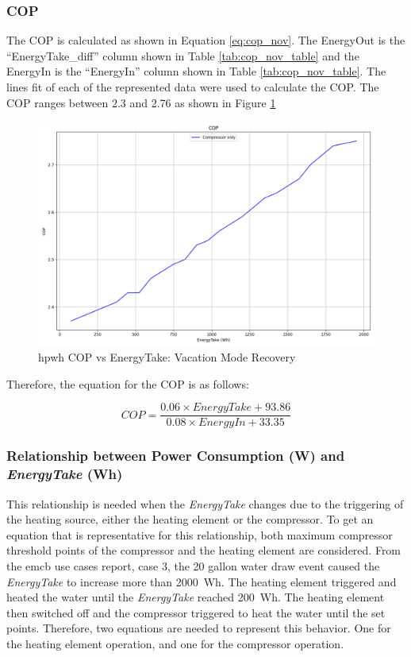 \subsubsection{COP}

The COP is calculated as shown in Equation \ref{eq:cop_nov}. The EnergyOut is the ``EnergyTake\_diff'' column shown in Table \ref{tab:cop_nov_table} and the EnergyIn is the ``EnergyIn'' column shown in Table \ref{tab:cop_nov_table}. The lines fit of each of the represented data were used to calculate the COP. The COP ranges between 2.3 and 2.76 as shown in Figure \ref{fig:cop_nov}

\begin{figure}[htp!]
    \centering
    \includegraphics[width=0.9\columnwidth]{Pictures/cop_nov.png}
    \caption{\gls{hpwh} COP vs EnergyTake: Vacation Mode Recovery}
    \label{fig:cop_nov}
\end{figure}

Therefore, the equation for the COP is as follows:

\begin{equation}\label{eq:cop_nov_lines_fit}
    COP = \frac{0.06 \times \textit{EnergyTake} + 93.86}{0.08 \times \textit{EnergyIn} + 33.35}
\end{equation}

\newpage

\subsubsection{Relationship between Power Consumption (W) and \textit{EnergyTake} (Wh)}

This relationship is needed when the \textit{EnergyTake} changes due to the triggering of the heating source, either the heating element or the compressor. To get an equation that is representative for this relationship, both maximum compressor threshold points of the compressor and the heating element are considered. From the \gls{emcb} use cases report, case 3, the 20 gallon water draw event caused the \textit{EnergyTake} to increase more than 2000~Wh. The heating element triggered and heated the water until the \textit{EnergyTake} reached 200~Wh. The heating element then switched off and the compressor triggered to heat the water until the set points. Therefore, two equations are needed to represent this behavior. One for the heating element operation, and one for the compressor operation. 

